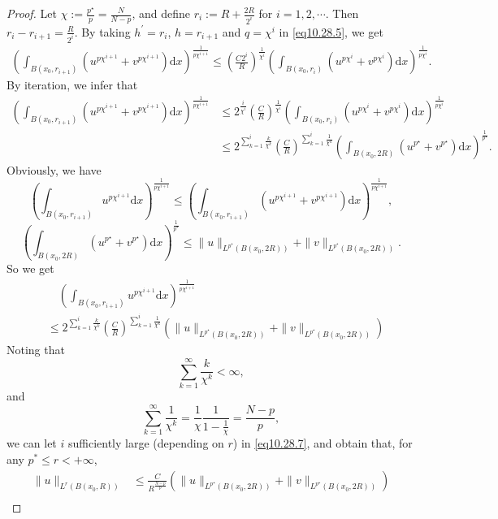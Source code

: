 \documentclass[12pt]{amsart}
\theoremstyle{definition}
\theoremstyle{remark}
\theoremstyle{conclusion}
\theoremstyle{conjecture}
\numberwithin{equation}{section}
\begin{document}
\begin{proof}
Let $\chi:=\frac{p^{\star}}{p}=\frac{N}{N-p}$, and define $r_{i}:=R+\frac{2R}{2^i}$ for $i=1,2,\cdots$. Then $r_{i}-r_{i+1}=\frac{R}{2^{i}}$. By taking $h^\prime=r_{i}$, $h=r_{i+1}$ and $q=\chi^i$ in \eqref{eq10.28.5}, we get
\begin{align}\label{eq10.28.6}
\left( \int_{B(x_0,r_{i+1})} (u^{p\chi^{i+1}}+v^{p\chi^{i+1}}) \mathrm{d}x  \right)^\frac{1}{p\chi^{i+1}}
\leq  \left( \frac{C 2^{i}}{R} \right)^\frac{1}{\chi^i} \left( \int_{B(x_0,r_{i})} (u^{p\chi^i}+v^{p\chi^i}) \mathrm{d}x  \right)^\frac{1}{p\chi^i}.
\end{align}
By iteration, we infer that
\begin{align*}
\left( \int_{B(x_0,r_{i+1})} (u^{p\chi^{i+1}}+v^{p\chi^{i+1}}) \mathrm{d}x  \right)^\frac{1}{p\chi^{i+1}}
&\leq  2^\frac{i}{\chi^i} \left( \frac{C}{R} \right)^\frac{1}{\chi^i} \left( \int_{B(x_0,r_{i})} (u^{p\chi^i}+v^{p\chi^i}) \mathrm{d}x  \right)^\frac{1}{p\chi^i} \\
&\leq  2^{\sum_{k=1}^i \frac{k}{\chi^k}} \left( \frac{C}{R} \right)^{\sum_{k=1}^i\frac{1}{\chi^k}} \left( \int_{B(x_0,2R)} (u^{p^{\star}}+v^{p^{\star}}) \mathrm{d}x  \right)^\frac{1}{p^{\star}}. \nonumber
\end{align*}
Obviously, we have
$$\left( \int_{B(x_0,r_{i+1})} u^{p\chi^{i+1}} \mathrm{d}x  \right)^\frac{1}{p\chi^{i+1}} \leq\left( \int_{B(x_0,r_{i+1})} (u^{p\chi^{i+1}}+v^{p\chi^{i+1}}) \mathrm{d}x  \right)^\frac{1}{p\chi^{i+1}},$$
$$\left( \int_{B(x_0,2R)} (u^{p^{\star}}+v^{p^{\star}}) \mathrm{d}x  \right)^\frac{1}{p^{\star}} \leq \|u\|_{L^{p^{\star}}(B(x_0,2R))}+\|v\|_{L^{p^{\star}}(B(x_0,2R))}.$$
So we get
\begin{align}\label{eq10.28.7}
    &\quad \left( \int_{B(x_0,r_{i+1})} u^{p\chi^{i+1}} \mathrm{d}x  \right)^\frac{1}{p\chi^{i+1}} \\
    &\leq 2^{\sum_{k=1}^i \frac{k}{\chi^k}} \left( \frac{C}{R} \right)^{\sum_{k=1}^i\frac{1}{\chi^k}} \left( \|u\|_{L^{p^{\star}}(B(x_0,2R))}+\|v\|_{L^{p^{\star}}(B(x_0,2R))}\right)\nonumber
\end{align}
Noting that
$$ \sum_{k=1}^\infty \frac{k}{\chi^k} <\infty, $$
and
$$ \sum_{k=1}^\infty \frac{1}{\chi^k} =\frac{1}{\chi} \frac{1}{1-\frac{1}{\chi}} = \frac{N-p}{p}, $$
we can let $i$ sufficiently large (depending on $r$) in \eqref{eq10.28.7}, and obtain that, for any $p^{\ast}\leq r<+\infty$,
\begin{align}\label{eq10.28.9}
\|u\|_{L^r(B(x_0,R))}
&\leq \frac{C}{R^\frac{N-p}{p}} \left(\|u\|_{L^{p^{\star}}(B(x_0,2R))}+\|v\|_{L^{p^{\star}}(B(x_0,2R))}\right)\\

\end{align}
\end{proof}
\end{document}

